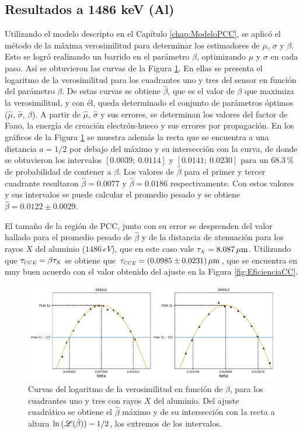 \subsection{Resultados a 1486 keV (Al)}
\noindent Utilizando el modelo descripto en el Capítulo \ref{chap:ModeloPCC}, se aplicó el método de la máxima verosimilitud para determinar los estimadores de $\mu$, $\sigma$ y $\beta$. Esto se logró realizando un barrido en el parámetro $\beta$, optimizando $\mu$ y $\sigma$ en cada paso. Así se obtuvieron las curvas de la Figura \ref{fig:Al_barridos_beta}. En ellas se presenta el logaritmo de la verosimilitud para los cuadrantes uno y tres del sensor en función del parámetro $\beta$. De estas curvas se obtiene $\hat{\beta}$, que es el valor de $\beta$ que maximiza la verosimilitud, y con él, queda determinado el conjunto de parámetros óptimos ($\hat{\mu}$, $\hat{\sigma}$, $\hat{\beta}$). A partir de $\hat{\mu}$, $\hat{\sigma}$ y sus errores, se determinan los valores del factor de Fano, la energía de creación electrón-hueco y sus errores por propagación. En los gráficos de la Figura \ref{fig:Al_barridos_beta} se muestra además la recta que se encuentra a una distancia $a=1/2$ por debajo del máximo y su intersección con la curva, de donde se obtuvieron los intervalos $[0.0039;\ 0.0114]$ y $[0.0141;\ 0.0230]$ para un $68.3\,\%$ de probabilidad de contener a $\beta$. Los valores de $\hat{\beta}$ para el primer y tercer cuadrante resultaron $\hat{\beta} = 0.0077$ y $\hat{\beta}=0.0186$ respectivamente. Con estos valores y sus intervalos se puede calcular el promedio pesado y se obtiene $\hat{\beta} = 0.0122 \pm 0.0029 $.

El tamaño de la región de PCC, junto con su error se desprenden del valor hallado para el promedio pesado de $\hat{\beta}$ y de la distancia de atenuación para los rayos $X$ del aluminio ($1486\,\si{eV}$), que en este caso vale $\tau_{\scaleto{X}{4pt}} = 8.087\,\si{\mu m}$\cite{AttenuationLength}. Utilizando que $\tau_{\scaleto{CCE}{4pt}} = \beta \tau_{\scaleto{X}{4pt}}$ se obtiene que $\tau_{\scaleto{CCE}{4pt}} = (0.0985 \pm 0.0231)\,\si{\mu m} $, que se encuentra en muy buen acuerdo con el valor obtenido del ajuste en la Figura \ref{fig:EficienciaCC}\cite{PCC-CCE-interno}.
\begin{figure}[h]
    \centering
        \includegraphics[scale=0.5]{Figs/Al_barridos_beta.pdf}
    \caption{Curvas del logaritmo de la verosimilitud en función de $\beta$, para los cuadrantes uno y tres con rayos $X$ del aluminio. Del ajuste cuadrático se obtiene el $\hat{\beta}$ máximo y de su intersección con la recta a altura $\ln{(\mathscr{L}(\hat{\beta}))} - 1/2$, los extremos de los intervalos.}
    \label{fig:Al_barridos_beta}
\end{figure}

